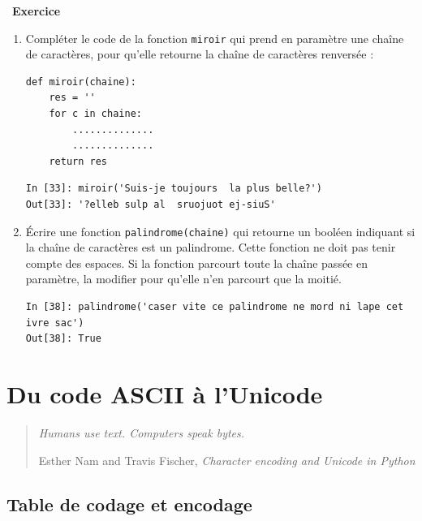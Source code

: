 \documentclass[a4paper, french, 12pt]{article}  %
\newcounter{exo}
\newenvironment{exercice}[1]
{\par \medskip   \addtocounter{exo}{1} \noindent  
\begin{bclogo}[arrondi =0.1,   noborder = true, logo=\bccrayon, marge=4]{~\textbf{Exercice} \textbf{\theexo} {\itshape #1} }  \par}
{
\end{bclogo}
 \par \bigskip }
\newcounter{def}
\newlength{\parpointille}
\newcommand{\Pointilles}[2]{%
\multido{}{#1}{%
\makebox[#2]{\dotfill}\\[\parpointille]
}}
\begin{document}
\begin{exercice}{}

\begin{enumerate}
	\item Compléter le code de la  fonction \texttt{miroir} qui prend en paramètre une chaîne de caractères, pour qu'elle  retourne la chaîne de caractères renversée :

{\doublespacing
\begin{lstlisting}
def miroir(chaine):
    res = ''
    for c in chaine:
        ..............
        ..............
    return res
\end{lstlisting}
}


\begin{lstlisting}
In [33]: miroir('Suis-je toujours  la plus belle?')
Out[33]: '?elleb sulp al  sruojuot ej-siuS'
\end{lstlisting}

\item Écrire une fonction \texttt{palindrome(chaine)} qui retourne un booléen indiquant si la chaîne de caractères est un palindrome. Cette fonction ne doit pas tenir compte des espaces. Si la fonction parcourt toute la chaîne passée en paramètre, la modifier pour qu'elle n'en parcourt que la moitié.

\begin{lstlisting}
In [38]: palindrome('caser vite ce palindrome ne mord ni lape cet ivre sac')
Out[38]: True
\end{lstlisting}


    \Pointilles{10}{\linewidth}
    
    
\end{enumerate}
\end{exercice}

\section{Du code ASCII à l'Unicode}


\begin{quote}
{\itshape
Humans use text. Computers speak bytes. }

Esther Nam and Travis Fischer, \textit{Character encoding and Unicode in Python}
\end{quote}


\medskip


\subsection{Table de codage et encodage}
\end{document}
